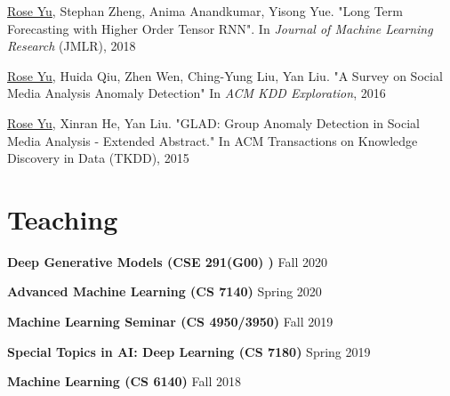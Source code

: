 \documentclass[margin,line]{res}
\begin{document}
\begin{resume}
\begin{enumerate}[label={[J\arabic*]},leftmargin=*]
\item \underline{Rose Yu}, Stephan Zheng, Anima Anandkumar, Yisong Yue. "Long Term Forecasting with Higher Order Tensor RNN". In  \textit{ Journal of Machine Learning Research} (JMLR), 2018




\item \underline{Rose Yu}, Huida Qiu, Zhen Wen, Ching-Yung Liu,  Yan Liu. "A Survey on Social Media Analysis  Anomaly Detection" In \textit{ACM KDD Exploration},  2016

\item \underline{Rose Yu}, Xinran He, Yan Liu. "GLAD: Group Anomaly Detection in Social Media Analysis - Extended Abstract." In \textit{}ACM Transactions on Knowledge Discovery in Data  (TKDD), 2015
\end{enumerate}


\section{\sc Teaching }
 {\bf Deep Generative Models  (CSE 291(G00) )}   \hfill  {Fall 2020} 



 {\bf Advanced Machine Learning  (CS 7140)}   \hfill  { Spring 2020} 


 {\bf Machine Learning Seminar (CS 4950/3950) }   \hfill  { Fall 2019} 

 
 {\bf Special Topics in AI: Deep Learning (CS 7180)}   \hfill  { Spring 2019} 


 {\bf Machine Learning (CS 6140)}   \hfill  { Fall 2018 } 






%
%
% 
%
%
%
%
%
%
%
%





\end{resume}
\end{document}
